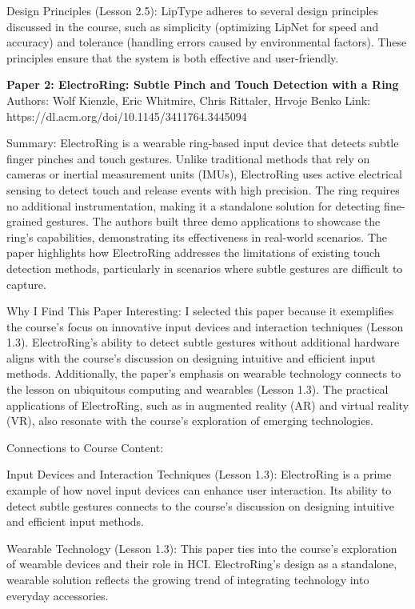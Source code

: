 \documentclass[
	letterpaper, %
]{jdf}
\begin{document}
Design Principles (Lesson 2.5): LipType adheres to several design principles discussed in the course, such as simplicity (optimizing LipNet for speed and accuracy) and tolerance (handling errors caused by environmental factors). These principles ensure that the system is both effective and user-friendly.

\textbf{Paper 2: ElectroRing: Subtle Pinch and Touch Detection with a Ring}
\newline Authors: Wolf Kienzle, Eric Whitmire, Chris Rittaler, Hrvoje Benko
\newline Link: https://dl.acm.org/doi/10.1145/3411764.3445094

Summary:
ElectroRing is a wearable ring-based input device that detects subtle finger pinches and touch gestures. Unlike traditional methods that rely on cameras or inertial measurement units (IMUs), ElectroRing uses active electrical sensing to detect touch and release events with high precision. The ring requires no additional instrumentation, making it a standalone solution for detecting fine-grained gestures. The authors built three demo applications to showcase the ring’s capabilities, demonstrating its effectiveness in real-world scenarios. The paper highlights how ElectroRing addresses the limitations of existing touch detection methods, particularly in scenarios where subtle gestures are difficult to capture.

Why I Find This Paper Interesting:
I selected this paper because it exemplifies the course’s focus on innovative input devices and interaction techniques (Lesson 1.3). ElectroRing’s ability to detect subtle gestures without additional hardware aligns with the course’s discussion on designing intuitive and efficient input methods. Additionally, the paper’s emphasis on wearable technology connects to the lesson on ubiquitous computing and wearables (Lesson 1.3). The practical applications of ElectroRing, such as in augmented reality (AR) and virtual reality (VR), also resonate with the course’s exploration of emerging technologies.

Connections to Course Content:

Input Devices and Interaction Techniques (Lesson 1.3): ElectroRing is a prime example of how novel input devices can enhance user interaction. Its ability to detect subtle gestures connects to the course’s discussion on designing intuitive and efficient input methods.

Wearable Technology (Lesson 1.3): This paper ties into the course’s exploration of wearable devices and their role in HCI. ElectroRing’s design as a standalone, wearable solution reflects the growing trend of integrating technology into everyday accessories.
\end{document}
